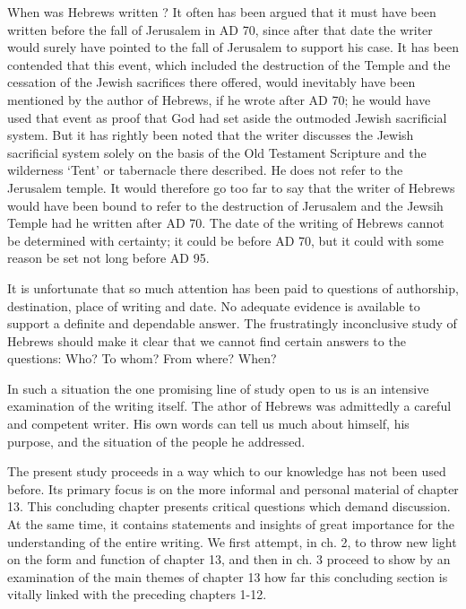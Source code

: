 When was Hebrews written ?
It often has been argued that it must have been written before the fall of
Jerusalem in AD 70, since after that date the writer would surely have
pointed to the fall of Jerusalem to support his case.
It has been contended that this event, which included the destruction of the
Temple and the cessation of the Jewish sacrifices there offered, would
inevitably have been mentioned by the author of Hebrews, if he wrote after AD
70; he would have used that event as proof that God had set aside the
outmoded Jewish sacrificial system.
But it has rightly been noted that the writer discusses the Jewish sacrificial
system solely on the basis of the Old Testament Scripture and the wilderness
`Tent' or tabernacle there described.
He does not refer to the Jerusalem temple.
It would therefore go too far to say that the writer of Hebrews would have been
bound to refer to the destruction of Jerusalem and the Jewsih Temple had he
written after AD 70.
The date of the writing of Hebrews cannot be determined with certainty; it
could be before AD 70, but it could with some reason be set not long before
AD 95.

It is unfortunate that so much attention has been paid to questions of
authorship, destination, place of writing and date.
No adequate evidence is available to support a definite and dependable answer.
The frustratingly inconclusive study of Hebrews should make it clear that we
cannot find certain answers to the questions: Who? To whom? From where? When?

In such a situation the one promising line of study open to us is an intensive
examination of the writing itself.
The athor of Hebrews was admittedly a careful and competent writer.
His own words can tell us much about himself, his purpose, and the situation of
the people he addressed.

The present study proceeds in a way which to our knowledge has not been used
before.
Its primary focus is on the more informal and personal material of chapter 13.
This concluding chapter presents critical questions which demand discussion.
At the same time, it contains statements and insights of great importance for
the understanding of the entire writing.
We first attempt, in ch. 2, to throw new light on the form and function of
chapter 13, and then in ch. 3 proceed to show by an examination of the main
themes of chapter 13 how far this concluding section is vitally linked with
the preceding chapters 1-12.

